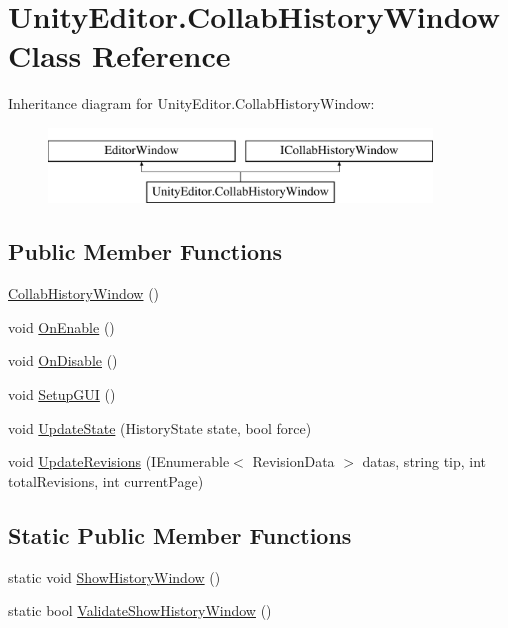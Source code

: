 \hypertarget{class_unity_editor_1_1_collab_history_window}{}\section{Unity\+Editor.\+Collab\+History\+Window Class Reference}
\label{class_unity_editor_1_1_collab_history_window}
Inheritance diagram for Unity\+Editor.\+Collab\+History\+Window\+:\begin{figure}[H]
\begin{center}
\leavevmode
\includegraphics[height=2.000000cm]{class_unity_editor_1_1_collab_history_window}
\end{center}
\end{figure}
\subsection*{Public Member Functions}
\begin{DoxyCompactItemize}
\item 
\mbox{\hyperlink{class_unity_editor_1_1_collab_history_window_ae8152d2af9a699452d676ef6beb7ee8d}{Collab\+History\+Window}} ()
\item 
void \mbox{\hyperlink{class_unity_editor_1_1_collab_history_window_a4a22a48d5e3872bbf08fc88a567d4439}{On\+Enable}} ()
\item 
void \mbox{\hyperlink{class_unity_editor_1_1_collab_history_window_abc4317801a0bf1e182864cdc9c549279}{On\+Disable}} ()
\item 
void \mbox{\hyperlink{class_unity_editor_1_1_collab_history_window_a68cea752240f1db1d6031a90061fc596}{Setup\+G\+UI}} ()
\item 
void \mbox{\hyperlink{class_unity_editor_1_1_collab_history_window_a4ae7622802cb319fa2e5e59d8f423ee0}{Update\+State}} (History\+State state, bool force)
\item 
void \mbox{\hyperlink{class_unity_editor_1_1_collab_history_window_a2bf80bf9b907918026d8f3337cea00e6}{Update\+Revisions}} (I\+Enumerable$<$ Revision\+Data $>$ datas, string tip, int total\+Revisions, int current\+Page)
\end{DoxyCompactItemize}
\subsection*{Static Public Member Functions}
\begin{DoxyCompactItemize}
\item 
static void \mbox{\hyperlink{class_unity_editor_1_1_collab_history_window_a9c15d2dab05897a8eaf131270b2434ab}{Show\+History\+Window}} ()
\item 
static bool \mbox{\hyperlink{class_unity_editor_1_1_collab_history_window_a14602ae7c3c0aff3090182e0a030c2cd}{Validate\+Show\+History\+Window}} ()
\end{DoxyCompactItemize}
